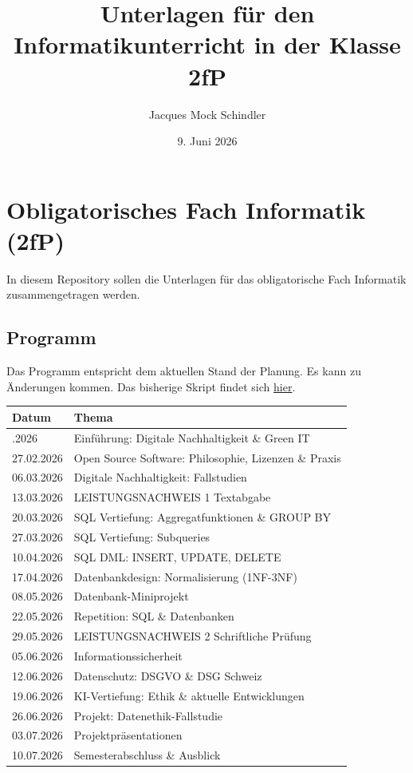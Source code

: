 \documentclass[
  nswissgerman,
  a4paper,
  DIV=11,
  numbers=noendperiod,
  ngerman]{scrreprt}
\title{Unterlagen für den Informatikunterricht in der Klasse 2fP}
\author{Jacques Mock Schindler}
\date{9. Juni 2026}
\newcounter{none} %
\renewcommand*\contentsname{Inhaltsverzeichnis}
\newcommand\contentsname{Inhaltsverzeichnis}
\begin{document}
\maketitle

\renewcommand*\contentsname{Inhaltsverzeichnis}
{
\setcounter{tocdepth}{2}
\tableofcontents
}

\chapter{Obligatorisches Fach Informatik
(2fP)}\label{obligatorisches-fach-informatik-2fp}

In diesem Repository sollen die Unterlagen für das obligatorische Fach
Informatik zusammengetragen werden.

\section{Programm}\label{programm}

Das Programm entspricht dem aktuellen Stand der Planung. Es kann zu
Änderungen kommen. Das bisherige Skript findet sich
\href{https://i-fp-24-28.github.io/Skript/}{hier}.

{\def\LTcaptype{none} %
\begin{longtable}[]{@{}ll@{}}
\toprule\noalign{}
Datum & Thema \\
\midrule\noalign{}
\endhead
\bottomrule\noalign{}
\endlastfoot
20.02.2026 & Einführung: Digitale Nachhaltigkeit \& Green IT \\
27.02.2026 & Open Source Software: Philosophie, Lizenzen \& Praxis \\
06.03.2026 & Digitale Nachhaltigkeit: Fallstudien \\
13.03.2026 & LEISTUNGSNACHWEIS 1 Textabgabe \\
20.03.2026 & SQL Vertiefung: Aggregatfunktionen \& GROUP BY \\
27.03.2026 & SQL Vertiefung: Subqueries \\
10.04.2026 & SQL DML: INSERT, UPDATE, DELETE \\
17.04.2026 & Datenbankdesign: Normalisierung (1NF-3NF) \\
08.05.2026 & Datenbank-Miniprojekt \\
22.05.2026 & Repetition: SQL \& Datenbanken \\
29.05.2026 & LEISTUNGSNACHWEIS 2 Schriftliche Prüfung \\
05.06.2026 & Informationssicherheit \\
12.06.2026 & Datenschutz: DSGVO \& DSG Schweiz \\
19.06.2026 & KI-Vertiefung: Ethik \& aktuelle Entwicklungen \\
26.06.2026 & Projekt: Datenethik-Fallstudie \\
03.07.2026 & Projektpräsentationen \\
10.07.2026 & Semesterabschluss \& Ausblick \\
\end{longtable}
}
\end{document}
